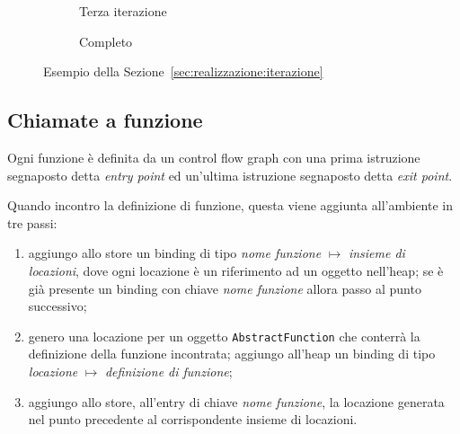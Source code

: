 \begin{figure}[htbp]
\begin{subfigure}{.8\linewidth}
        \caption{Terza iterazione}
        \label{fig:realizzazione:while-3}
    \end{subfigure}%
    \begin{subfigure}{.8\linewidth}
        \centering
        \caption{Completo}
        \label{fig:realizzazione:while-4}
    \end{subfigure}%
    \caption{Esempio della Sezione~\ref{sec:realizzazione:iterazione}}
    \label{fig:realizzazione:iterazione}
\end{figure}

\subsection{Chiamate a funzione}\label{sec:callstring}

Ogni funzione è definita da un control flow graph con una prima istruzione segnaposto detta \emph{entry point} ed un'ultima istruzione segnaposto detta \emph{exit point}.

Quando incontro la definizione di funzione, questa viene aggiunta all'ambiente in tre passi:
\begin{enumerate}
    \item aggiungo allo store un binding di tipo \emph{nome funzione} $\mapsto$ \emph{insieme di locazioni}, dove ogni locazione è un riferimento ad un oggetto nell'heap; se è già presente un binding con chiave \emph{nome funzione} allora passo al punto successivo;
    \item genero una locazione per un oggetto \texttt{AbstractFunction} che conterrà la definizione della funzione incontrata; aggiungo all'heap un binding di tipo \emph{locazione} $\mapsto$ \emph{definizione di funzione};
    \item aggiungo allo store, all'entry di chiave \emph{nome funzione}, la locazione generata nel punto precedente al corrispondente insieme di locazioni.
\end{enumerate}

